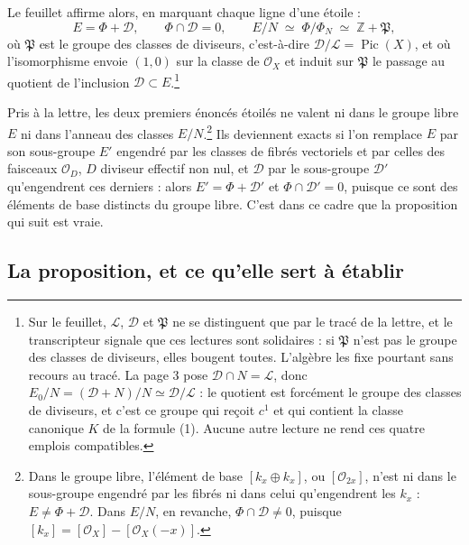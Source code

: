 \documentclass[11pt,a4paper]{article}
\begin{document}
Le feuillet affirme alors, en marquant chaque ligne d'une étoile :
\[
  E = \Phi + \mathcal{D}, \qquad \Phi \cap \mathcal{D} = 0,
  \qquad E/N \;\simeq\; \Phi/\Phi_{N} \;\simeq\; \mathbb{Z} + \mathfrak{P} ,
\]
où $\mathfrak{P}$ est le groupe des classes de diviseurs, c'est-à-dire
$\mathcal{D}/\mathcal{L} = \operatorname{Pic}(X)$, et où l'isomorphisme envoie
$(1,0)$ sur la classe de $\mathcal{O}_{X}$ et induit sur $\mathfrak{P}$ le
passage au quotient de l'inclusion $\mathcal{D} \subset E$.\footnote{Sur le
feuillet, $\mathcal{L}$, $\mathcal{D}$ et $\mathfrak{P}$ ne se distinguent que
par le tracé de la lettre, et le transcripteur signale que ces lectures sont
solidaires : si $\mathfrak{P}$ n'est pas le groupe des classes de diviseurs,
elles bougent toutes. L'algèbre les fixe pourtant sans recours au tracé. La
page 3 pose $\mathcal{D} \cap N = \mathcal{L}$, donc
$E_{0}/N = (\mathcal{D} + N)/N \simeq \mathcal{D}/\mathcal{L}$ : le quotient est
forcément le groupe des classes de diviseurs, et c'est ce groupe qui reçoit
$c^{1}$ et qui contient la classe canonique $K$ de la formule (1). Aucune autre
lecture ne rend ces quatre emplois compatibles.}

Pris à la lettre, les deux premiers énoncés étoilés ne valent ni dans le groupe
libre $E$ ni dans l'anneau des classes $E/N$.\footnote{Dans le groupe libre,
l'élément de base $[k_{x} \oplus k_{x}]$, ou $[\mathcal{O}_{2x}]$, n'est ni dans
le sous-groupe engendré par les fibrés ni dans celui qu'engendrent les $k_{x}$ :
$E \neq \Phi + \mathcal{D}$. Dans $E/N$, en revanche, $\Phi \cap \mathcal{D}
\neq 0$, puisque $[k_{x}] = [\mathcal{O}_{X}] - [\mathcal{O}_{X}(-x)]$.} Ils
deviennent exacts si l'on remplace $E$ par son sous-groupe $E'$ engendré par
les classes de fibrés vectoriels et par celles des faisceaux $\mathcal{O}_{D}$,
$D$ diviseur effectif non nul, et $\mathcal{D}$ par le sous-groupe $\mathcal{D}'$
qu'engendrent ces derniers : alors $E' = \Phi + \mathcal{D}'$ et $\Phi \cap
\mathcal{D}' = 0$, puisque ce sont des éléments de base distincts du groupe
libre. C'est dans ce cadre que la proposition qui suit est vraie.

\subsection*{La proposition, et ce qu'elle sert à établir}
\end{document}
